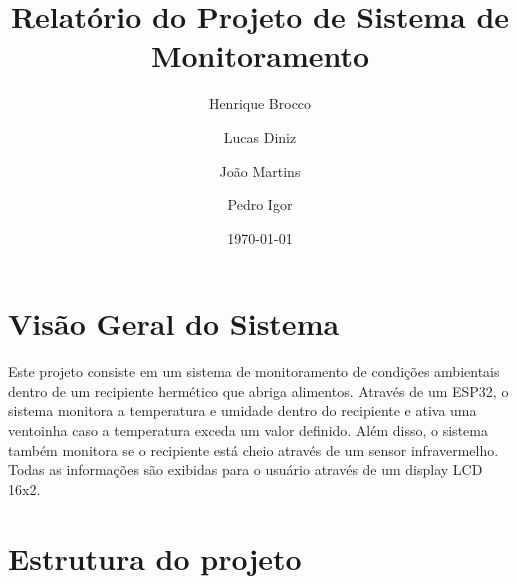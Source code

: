 \documentclass{article}
\title{Relatório do Projeto de Sistema de Monitoramento}
\author{Henrique Brocco \and Lucas Diniz \and João Martins \and Pedro Igor}
\date{\today}
\begin{document}
\maketitle
\section{Visão Geral do Sistema}
Este projeto consiste em um sistema de monitoramento de condições ambientais dentro de um recipiente hermético que abriga alimentos. Através de um ESP32, o sistema monitora a temperatura e umidade dentro do recipiente e ativa uma ventoinha caso a temperatura exceda um valor definido. Além disso, o sistema também monitora se o recipiente está cheio através de um sensor infravermelho. Todas as informações são exibidas para o usuário através de um display LCD 16x2.
\section{Estrutura do projeto}
\end{document}
